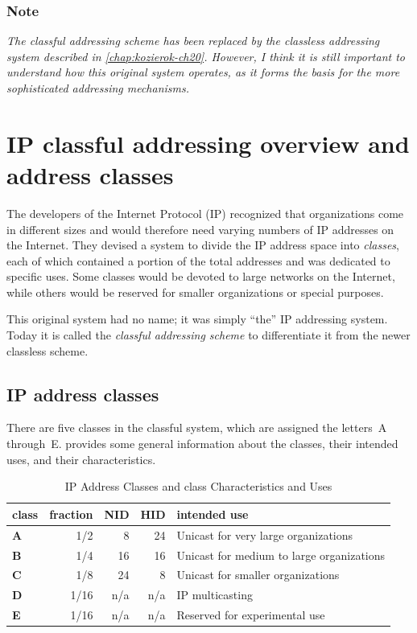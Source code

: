 \documentclass[b5paper,11pt]{memoir}
\begin{document}
\subsubsection[Note]{\texorpdfstring{\protect\hypertarget{ch17.htmlux5cux23note-64}{}{}Note}{Note}}

\emph{The classful addressing scheme has been replaced by the classless addressing system described in \vref{chap:kozierok-ch20}.
However, I think it is still important to understand how this original system operates, as it forms the basis for the more sophisticated addressing mechanisms.}



\section{IP classful addressing overview and address classes}

The developers of the Internet Protocol (IP) recognized that organizations come in different sizes and would therefore need varying
numbers of IP addresses on the Internet.
They devised a system to divide the IP address space into {\emph{classes}}, each of which contained a portion of the total addresses and was dedicated to specific uses.
Some classes would be devoted to large networks on the Internet, while others would be reserved for smaller organizations or special purposes.

This original system had no name; it was simply ``the'' IP addressing system.
Today it is called the \emph{classful addressing scheme} to differentiate it from the newer classless scheme.



\subsection{IP address classes}

There are five classes in the classful system, which are assigned the letters~A through~E.
 provides some general information about the classes, their intended uses, and their characteristics.

\begin{table}
   \begin{tabular}{lrrrl}
   \toprule
   class      & fraction & NID & HID & intended use\\
   \midrule
   \textbf{A} & 1/2      & 8   & 24  & Unicast for very large organizations\\
   \textbf{B} & 1/4      & 16  & 16  & Unicast for medium to large organizations\\
   \textbf{C} & 1/8      & 24  & 8   & Unicast for smaller organizations\\
   \textbf{D} & 1/16     & n/a & n/a & IP multicasting\\
   \textbf{E} & 1/16     & n/a & n/a & Reserved for experimental use\\
   \bottomrule
   \end{tabular}
   \caption{IP Address Classes and class Characteristics and Uses}
   \label{tab:ip-address-classes}
\end{table}
\end{document}
